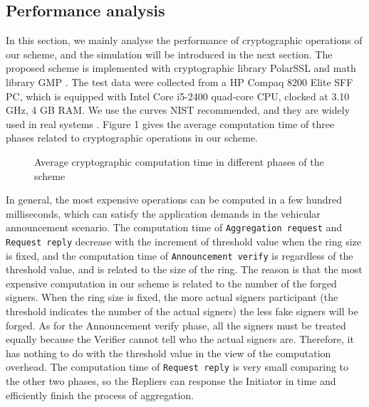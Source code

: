 \documentclass[a4paper]{article}
\begin{document}
\subsection{Performance analysis}
In this section, we mainly analyse the performance of cryptographic operations of our scheme, and the simulation will be introduced in the next section. The proposed scheme is implemented with cryptographic library PolarSSL \cite{POLARSSL} and math library GMP \cite{GMP}. The test data were collected from a HP Compaq 8200 Elite SFF PC, which is equipped with Intel Core i5-2400 quad-core CPU, clocked at 3.10 GHz, 4 GB RAM. We use the curves NIST recommended, and they are widely used in real systems \cite{ANSI9.62}. Figure 1 gives the average computation time of three phases related to cryptographic operations in our scheme.

\begin{figure}
  \centering
  \subfigure[Ring size $r = 20$]{\texttt{[image: 20]}}
  \subfigure[Ring size $r = 30$]{\texttt{[image: 30]}}
  \subfigure[Ring size $r = 40$]{\texttt{[image: 40]}}
  \subfigure[Ring size $r = 50$]{\texttt{[image: 50]}}
  \caption{Average cryptographic computation time in different phases of the scheme}
\end{figure}

In general, the most expensive operations can be computed in a few hundred milliseconds, which can satisfy the application demands in the vehicular announcement scenario. The computation time of \texttt{Aggregation request} and \texttt{Request reply} decrease with the increment of threshold value when the ring size is fixed, and the computation time of \texttt{Announcement verify} is regardless of the threshold value, and is related to the size of the ring. The reason is that the most expensive computation in our scheme is related to the number of the forged signers. When the ring size is fixed, the more actual signers participant (the threshold indicates the number of the actual signers) the less fake signers will be forged. As for the Announcement verify phase, all the signers must be treated equally because the Verifier cannot tell who the actual signers are. Therefore, it has nothing to do with the threshold value in the view of the computation overhead. The computation time of \texttt{Request reply} is very small comparing to the other two phases, so the Repliers can response the Initiator in time and efficiently finish the process of aggregation.
\end{document}
